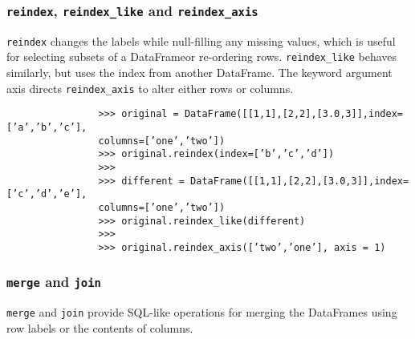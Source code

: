 \documentclass[KSmain.tex]{subfiles}
\begin{document}
			\subsubsection*{\texttt{reindex}, \texttt{reindex\_like} and \texttt{reindex\_axis}}
			\texttt{reindex} changes the labels while null-filling any missing values, which is useful for selecting subsets of a
			DataFrameor re-ordering rows. \texttt{reindex\_like} behaves similarly, but uses the index from another DataFrame.
			The keyword argument axis directs \texttt{reindex\_axis} to alter either rows or columns.
			\begin{framed}
				\begin{verbatim}
				>>> original = DataFrame([[1,1],[2,2],[3.0,3]],index=[’a’,’b’,’c’],
				columns=[’one’,’two’])
				>>> original.reindex(index=[’b’,’c’,’d’])
				>>>
				>>> different = DataFrame([[1,1],[2,2],[3.0,3]],index=[’c’,’d’,’e’],
				columns=[’one’,’two’])
				>>> original.reindex_like(different)
				>>>
				>>> original.reindex_axis([’two’,’one’], axis = 1)
				\end{verbatim}
			\end{framed}
\newpage

\subsubsection*{\texttt{merge} and \texttt{join}}

\texttt{merge} and \texttt{join} provide SQL-like operations for merging the DataFrames using row labels or the contents
of columns. 
\end{document}
